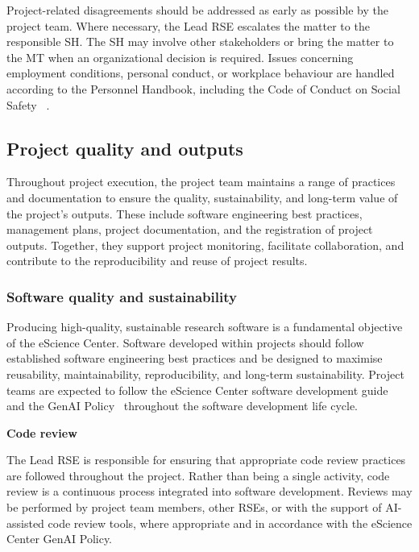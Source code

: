 Project-related disagreements should be addressed as early as possible by the project team. Where necessary, the 
Lead RSE escalates the matter to the responsible SH. The SH may involve other stakeholders or bring the matter to the 
MT when an organizational decision is required. Issues concerning employment conditions, personal conduct, or 
workplace behaviour are handled according to the Personnel Handbook, including the Code of Conduct on Social Safety 
~\cite{intranet}. 

\subsection{Project quality and outputs}
\label{sec:exec:quality}
Throughout project execution, the project team maintains a range of practices and documentation to ensure the quality,
sustainability, and long-term value of the project's outputs. These include software engineering best practices,
management plans, project documentation, and the registration of project outputs. Together, they support project
monitoring, facilitate collaboration, and contribute to the reproducibility and reuse of project results.

\subsubsection{Software quality and sustainability}
\label{sec:exec:softwarequality}
Producing high-quality, sustainable research software is a fundamental objective of the eScience Center. Software
developed within projects should follow established software engineering best practices and be designed to maximise
reusability, maintainability, reproducibility, and long-term sustainability. Project teams are expected to follow the
eScience Center software development guide~\cite{guide-nlesc} and the GenAI Policy~\cite{nlesc2023genai} throughout the
software development life cycle.

\medskip
\noindent\textbf{Code review}\par
\smallskip
The Lead RSE is responsible for ensuring that appropriate code review practices are followed throughout the project.
Rather than being a single activity, code review is a continuous process integrated into software development. Reviews
may be performed by project team members, other RSEs, or with the support of AI-assisted code review tools, where
appropriate and in accordance with the eScience Center GenAI Policy.

